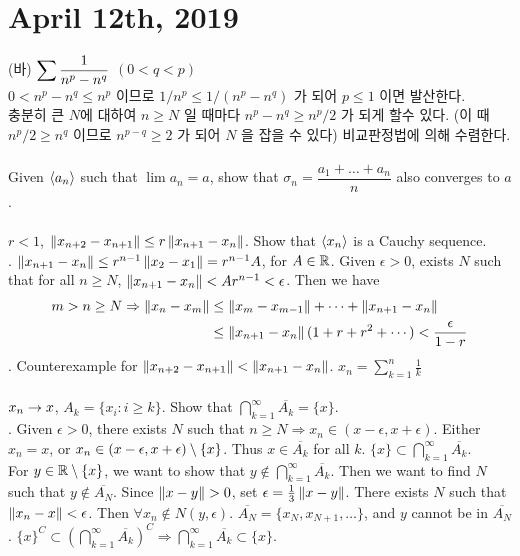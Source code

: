 \section*{April 12th, 2019}

 (바) $ \displaystyle \sum \frac{1}{n^p-n^q} $ $(0 < q < p)$\\
$ 0< n^p-n^q \leq n^p $ 이므로 $ 1/n^p \leq 1/(n^p-n^q) $ 가 되어 $p \leq 1$ 이면 발산한다.\\
충분히 큰 $N$에 대하여 $n\geq N$ 일 때마다 $n^p-n^q\geq n^p/2$ 가 되게 할수 있다. (이 때 $n^p/2\geq n^q$ 이므로 $n^{p-q}\geq 2$ 가 되어 $N$ 을 잡을 수 있다) 비교판정법에 의해 수렴한다.\\
\\
 Given $\left\langle a_n \right\rangle$ such that $\lim a_n = a$, show that $\sigma_n = \dfrac{a_1+\dots+a_n}{n}$ also converges to $a$.\\
\\
 $ r < 1 $, $ \left\lVert x_{n+2} - x_{n+1}\right\rVert\leq r \left\lVert x_{n+1} - x_n\right\rVert $. Show that $\left\langle x_n \right\rangle$ is a Cauchy sequence.\\
\pf. $\left\lVert x_{n+1} - x_n\right\rVert \leq r^{n-1} \left\lVert x_2-x_1\right\rVert = r^{n-1} A$, for $A\in \mathbb{R}$. Given $\epsilon>0$, exists $N$ such that for all $n\geq N$, $\left\lVert x_{n+1}-x_n\right\rVert < Ar^{n-1}<\epsilon$. Then we have $$\begin{aligned}
m > n\geq N \Rightarrow \left\lVert x_n - x_m\right\rVert &\leq \left\lVert x_m-x_{m-1}\right\rVert + \cdots + \left\lVert x_{n+1}- x_n\right\rVert\\& \leq \left\lVert x_{n+1}-x_n\right\rVert (1+r+r^2+ \cdots) < \frac{\epsilon}{1-r}
\end{aligned} $$ 
\rmk. Counterexample for $\left\lVert x_{n+2} - x_{n+1}\right\rVert < \left\lVert x_{n+1}-x_n\right\rVert$. $x_n = \sum_{k=1}^{n} \frac{1}{k}$\\
\\
 $x_n\rightarrow x$, $A_k=\{x_i: i\geq k \}$. Show that $\bigcap_{k=1}^\infty \overline{A_k} = \{ x\}$.\\
\pf. Given $\epsilon > 0$, there exists $N$ such that $n\geq N \Rightarrow x_n\in (x-\epsilon, x+\epsilon)$. Either $x_n = x$, or $x_n \in (x-\epsilon, x + \epsilon) \setminus \{x\}$. Thus $x\in \overline{A_k}$ for all $k$. $\{x\}\subset \bigcap_{k=1}^\infty \overline{A_k}$.\\
For $y\in \mathbb{R}\setminus \{x\}$, we want to show that $y\notin \bigcap_{k=1}^\infty \overline{A_k}$. Then we want to find $N$ such that $y\notin \overline{A_N}$. Since $ \left\lVert x-y\right\rVert>0 $, set $\epsilon = \frac{1}{3}\left\lVert x-y\right\rVert$. There exists $N$ such that $\left\lVert x_n-x\right\rVert<\epsilon$. Then $\forall x_n \notin N(y, \epsilon)$. $\overline{A_N} = \{x_N, x_{N+1}, \dots \}$, and $y$ cannot be in $\overline{A_N}$. $\{x\}^C\subset \left(\bigcap_{k=1}^\infty \overline{A_k}\right)^C \Rightarrow \bigcap_{k=1}^\infty \overline{A_k}\subset \{x\}$.\\
